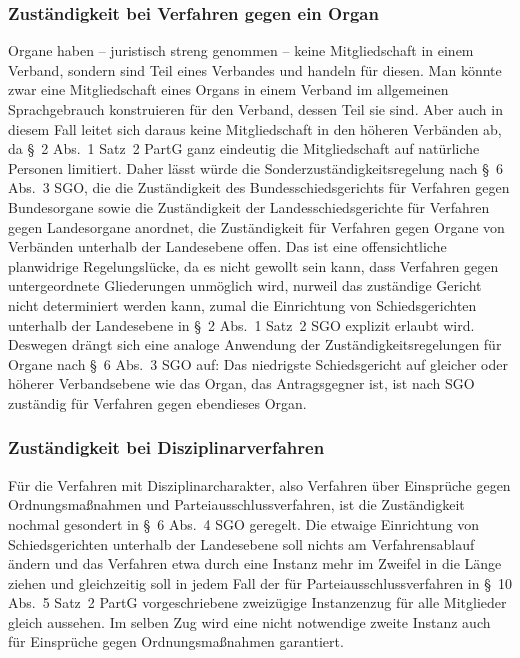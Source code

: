 \subsubsection{Zuständigkeit bei Verfahren gegen ein Organ}
\label{Anrufung:Kriterien:Zustaendigkeit:Organ}
Organe haben -- juristisch streng genommen -- keine Mitgliedschaft in einem Verband, sondern sind Teil eines Verbandes und handeln für diesen.
Man könnte zwar eine Mitgliedschaft eines Organs in einem Verband im allgemeinen Sprachgebrauch konstruieren für den Verband, dessen Teil sie sind.
Aber auch in diesem Fall leitet sich daraus keine Mitgliedschaft in den höheren Verbänden ab, da \S~2 Abs.~1 Satz~2 PartG ganz eindeutig die Mitgliedschaft auf natürliche Personen limitiert.
Daher lässt würde die Sonderzuständigkeitsregelung nach \S~6 Abs.~3 SGO, die die Zuständigkeit des Bundesschiedsgerichts für Verfahren gegen Bundesorgane sowie die Zuständigkeit der Landesschiedsgerichte für Verfahren gegen Landesorgane anordnet, die Zuständigkeit für Verfahren gegen Organe von Verbänden unterhalb der Landesebene offen.
Das ist eine offensichtliche planwidrige Regelungslücke, da es nicht gewollt sein kann, dass Verfahren gegen untergeordnete Gliederungen unmöglich wird, nurweil das zuständige Gericht nicht determiniert werden kann, zumal die Einrichtung von Schiedsgerichten unterhalb der Landesebene in \S~2 Abs.~1 Satz~2 SGO explizit erlaubt wird.
Deswegen drängt sich eine analoge Anwendung der Zuständigkeitsregelungen für Organe nach \S~6 Abs.~3 SGO auf: Das niedrigste Schiedsgericht auf gleicher oder höherer Verbandsebene wie das Organ, das Antragsgegner ist, ist nach SGO zuständig für Verfahren gegen ebendieses Organ.

\subsubsection{Zuständigkeit bei Disziplinarverfahren}
\label{Anrufung:Kriterien:Zustaendigkeit:Disziplinarverfahren}
Für die Verfahren mit Disziplinarcharakter, also Verfahren über Einsprüche gegen Ordnungsmaßnahmen und Parteiausschlussverfahren, ist die Zuständigkeit nochmal gesondert in \S~6 Abs.~4 SGO geregelt.
Die etwaige Einrichtung von Schiedsgerichten unterhalb der Landesebene soll nichts am Verfahrensablauf ändern und das Verfahren etwa durch eine Instanz mehr im Zweifel in die Länge ziehen und gleichzeitig soll in jedem Fall der für Parteiausschlussverfahren in \S~10 Abs.~5 Satz~2 PartG vorgeschriebene zweizügige Instanzenzug für alle Mitglieder gleich aussehen. Im selben Zug wird eine nicht notwendige zweite Instanz auch für Einsprüche gegen Ordnungsmaßnahmen garantiert.

